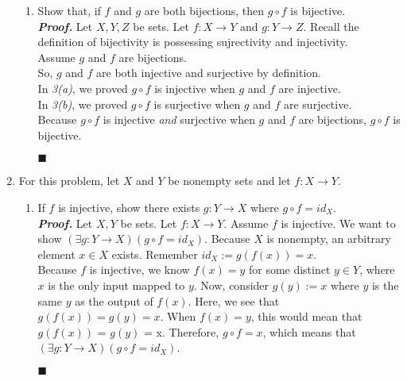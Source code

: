 \documentclass[11pt,a4paper]{article}
\begin{document}
\begin{enumerate}
\begin{enumerate}
        \item 
        Show that, if $f$ and $g$ are both bijections, then $g \circ f $ is bijective.  \\
        \emph{\textbf{Proof.}} Let $X, Y, Z $ be sets. Let $f: X \rightarrow Y$ and $g: Y \rightarrow Z $. Recall the definition of bijectivity is possessing sujrectivity and injectivity. \\
        Assume $g$ and $f$ are bijections. \\
        So, $g$ and $f$ are both injective and surjective by definition. \\
        In \emph{3(a)}, we proved $g \circ f $ is injective when $g$ and $f$ are injective. \\
        In \emph{3(b)}, we proved $g \circ f $ is surjective when $g$ and $f$ are surjective. \\
        Because $g \circ f $ is injective \emph{and} surjective when $g$ and $f$ are bijections, $g \circ f $ is bijective.
        \begin{flushright}
            $\blacksquare$
        \end{flushright}

    \end{enumerate}
    \newpage
    
    \item 
    For this problem, let $X$ and $Y$ be nonempty sets and let $f: X \rightarrow Y $.
    \begin{enumerate}
        \item 
        If $f$ is injective, show there exists $g: Y \rightarrow X  $ where $g \circ f = id_X $. \\
        \emph{\textbf{Proof.}} Let $X, Y $ be sets. Let $f : X \rightarrow Y $. Assume $f$ is injective.
        We want to show $(\exists g: Y \rightarrow X)(g \circ f = id_X) $.
        Because $X$ is nonempty, an arbitrary element $x \in X$ exists. Remember $id_X := g(f(x)) = x $. \\
        Because $f$ is injective, we know $f(x) = y$ for some distinct $y \in Y $, where $x$ is the only input mapped to $y$.
        Now, consider $g(y) := x $ where $y$ is the same $y$ as the output of $f(x)$. Here, we see that $g(f(x)) = g(y) = x $.  When $f(x) = y $, this would mean that $g(f(x)) $ = $g(y) $ = x. 
        Therefore, $g \circ f = x $, which means that $(\exists g: Y \rightarrow X)(g \circ f = id_X) $.
        \begin{flushright}
            $\blacksquare$
        \end{flushright}


\end{enumerate}
\end{enumerate}
\end{document}
